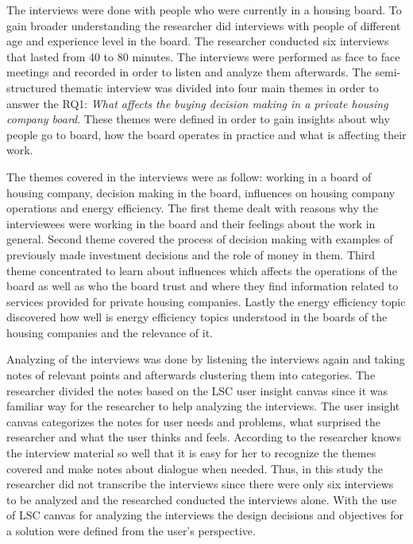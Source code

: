 The interviews were done with people who were currently in a housing board. To gain broader understanding the researcher did interviews with people of different age and experience level in the board. The researcher conducted six interviews that lasted from 40 to 80 minutes. The interviews were performed as face to face meetings and recorded in order to listen and analyze them afterwards. The semi-structured thematic interview was divided into four main themes in order to answer the RQ1: \emph{What affects the buying decision making in a private housing company board}. These themes were defined in order to gain insights about why people go to board, how the board operates in practice and what is affecting their work. 

The themes covered in the interviews were as follow: working in a board of housing company, decision making in the board, influences on housing company operations and energy efficiency.  The first theme dealt with reasons why the interviewees were working in the board and their feelings about the work in general.  Second theme covered the process of decision making with examples of previously made investment decisions and the role of money in them.  Third theme concentrated to learn about influences which affects the operations of the board as well as who the board trust and where they find information related to services provided for private housing companies.  Lastly the energy efficiency topic discovered how well is energy efficiency topics understood in the boards of the housing companies and the relevance of it.

Analyzing of the interviews was done by listening the interviews again and taking notes of relevant points and afterwards clustering them into categories. The researcher divided the notes based on the LSC user insight canvas since it was familiar way for the researcher to help analyzing the interviews. The user insight canvas categorizes the notes for user needs and problems, what surprised the researcher and what the user thinks and feels. According to \textcite{HH:2001} the researcher knows the interview material so well that it is easy for her to recognize the themes covered and make notes about dialogue when needed. Thus, in this study the researcher did not transcribe the interviews since there were only six interviews to be analyzed and the researched conducted the interviews alone. With the use of LSC canvas for analyzing the interviews the design decisions and objectives for a solution were defined from the user's perspective.

